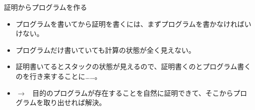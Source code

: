 \documentclass[cjk, 14pt]{beamer}
\begin{document}
\begin{frame}{証明からプログラムを作る}

  \begin{itemize}
    \item プログラムを書いてから証明を書くには、まずプログラムを書かなければいけない。
    \item プログラムだけ書いていても計算の状態が全く見えない。
    \item 証明書いてるとスタックの状態が見えるので、証明書くのとプログラム書くのを行き来することに……。
    \item $\rightarrow$ \, 目的のプログラムが存在することを自然に証明できて、そこからプログラムを取り出せれば解決。
  \end{itemize}

\end{frame}

\begin{frame}{}

\end{frame}
\end{document}

